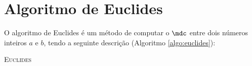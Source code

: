 \section{Algoritmo de Euclides}
\label{sec:algoritmo-de-euclides}

O algoritmo de Euclides é um método de computar o $\mdc$ entre dois números inteiros $a$ e $b$, tendo a seguinte descrição (Algoritmo \ref{algo:euclides}):

        \begin{algorithm}[!htbp]
                \SetAlgoLined
                \vspace{3mm}
                {}
                \SeN
                {}
                \caption{\textsc{Euclides}}\label{algo:euclides}
        \end{algorithm}

